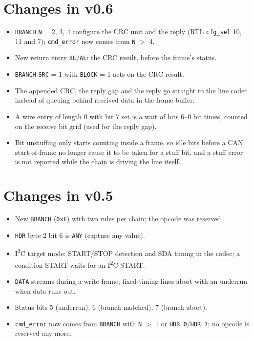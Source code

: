 \documentclass[11pt,a4paper]{article}
\newcommand{\sig}[1]{\texttt{#1}}
\begin{document}
\section{Changes in v0.6}

\begin{itemize}
\item \sig{BRANCH} \sig{N} = 2, 3, 4 configure the CRC unit and the reply (RTL \sig{cfg\_sel} 10, 11 and 7); \sig{cmd\_error} now comes from \sig{N} $>$ 4.
\item New return entry \texttt{8E}/\texttt{AE}: the CRC result, before the frame's status.
\item \sig{BRANCH} \sig{SRC} = 1 with \sig{BLOCK} = 1 acts on the CRC result.
\item The appended CRC, the reply gap and the reply go straight to the line codec instead of queuing behind received data in the frame buffer.
\item A wire entry of length 0 with bit 7 set is a wait of bits 6--0 bit times, counted on the receive bit grid (used for the reply gap).
\item Bit unstuffing only starts counting inside a frame, so idle bits before a CAN start-of-frame no longer cause it to be taken for a stuff bit, and a stuff error is not reported while the chain is driving the line itself.
\end{itemize}

\section{Changes in v0.5}

\begin{itemize}
\item New \sig{BRANCH} (\texttt{0xF}) with two rules per chain; the opcode was reserved.
\item \sig{HDR} byte 2 bit 6 is \sig{ANY} (capture any value).
\item I\textsuperscript{2}C target mode: START/STOP detection and SDA timing in the codec; a condition START waits for an I\textsuperscript{2}C START.
\item \sig{DATA} streams during a write frame; fixed-timing lines abort with an underrun when data runs out.
\item Status bits 5 (underrun), 6 (branch matched), 7 (branch abort).
\item \sig{cmd\_error} now comes from \sig{BRANCH} with \sig{N} $>$ 1 or \sig{HDR 0}/\sig{HDR 7}; no opcode is reserved any more.
\end{itemize}
\end{document}
